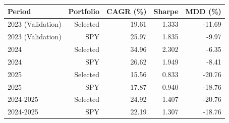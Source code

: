 \begin{tabular}{lrrrr}
\toprule
Period & Portfolio & CAGR (\%) & Sharpe & MDD (\%) \\
\midrule
2023 (Validation) & Selected & 19.61 & 1.333 & -11.69 \\
2023 (Validation) & SPY & 25.97 & 1.835 & -9.97 \\
2024 & Selected & 34.96 & 2.302 & -6.35 \\
2024 & SPY & 26.62 & 1.949 & -8.41 \\
2025 & Selected & 15.56 & 0.833 & -20.76 \\
2025 & SPY & 17.87 & 0.940 & -18.76 \\
2024-2025 & Selected & 24.92 & 1.407 & -20.76 \\
2024-2025 & SPY & 22.19 & 1.307 & -18.76 \\
\bottomrule
\end{tabular}

